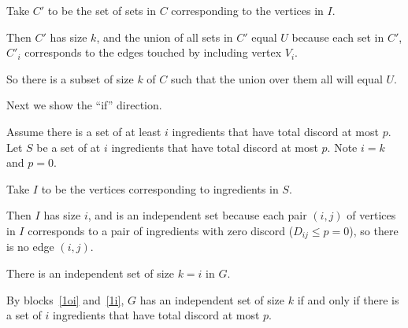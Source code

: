 \documentclass[11pt]{article}
\begin{document}
\begin{problems}
\begin{longFormProof}
\begin{block}[1oi]
      \step Take $C'$ to be the set of sets in $C$ corresponding to the vertices in $I$.

      \step Then $C'$ has size $k$, and the union of all sets in $C'$ equal $U$
              because each set in $C'$, $C'_i$ corresponds to the edges touched by including vertex $V_i$.

      \smallskip 
      \step So there is a subset of size $k$ of $C$ such that the union over them all will equal $U$.
    \end{block} 
    \step Next we show the ``if'' direction.
    \begin{block}[1i]
      {Assume there is a set of at least $i$ ingredients that have total discord at most $p$.}
      \step Let $S$ be a set of at $i$ ingredients that have total discord at most $p$.  Note $i=k$ and $p=0$.
      \smallskip 

      \step Take $I$ to be the vertices corresponding to ingredients in $S$.

      \step Then $I$ has size $i$, and is an independent set because
      each pair $(i,j)$ of vertices in $I$ corresponds to a pair of ingredients
      with zero discord ($D_{ij}\le p=0$), so there is no edge $(i,j)$.

      \smallskip 
      \step There is an independent set of size $k=i$ in $G$. 
    \end{block} 
    \step By blocks~\ref{1oi} and~\ref{1i},
    $G$ has an independent set of size $k$
    if and only if there is a set of $i$ ingredients that have total discord at most $p$.
  \end{longFormProof}







\end{problems}
\end{document}
